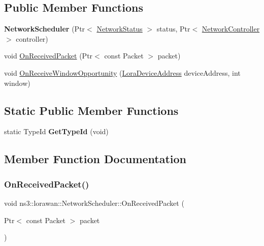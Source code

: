 \subsection*{Public Member Functions}
\begin{DoxyCompactItemize}
\item 
\mbox{\label{classns3_1_1lorawan_1_1NetworkScheduler_a02db446a0b34906f22f1f1769a15ae09}} 
{\bfseries Network\+Scheduler} (Ptr$<$ \hyperlink{classns3_1_1lorawan_1_1NetworkStatus}{Network\+Status} $>$ status, Ptr$<$ \hyperlink{classns3_1_1lorawan_1_1NetworkController}{Network\+Controller} $>$ controller)
\item 
void \hyperlink{classns3_1_1lorawan_1_1NetworkScheduler_a221f76541ed8a879c784beb2235abc42}{On\+Received\+Packet} (Ptr$<$ const Packet $>$ packet)
\item 
void \hyperlink{classns3_1_1lorawan_1_1NetworkScheduler_a9394830ed7fc351aa846a4c0635ddadc}{On\+Receive\+Window\+Opportunity} (\hyperlink{classns3_1_1lorawan_1_1LoraDeviceAddress}{Lora\+Device\+Address} device\+Address, int window)
\end{DoxyCompactItemize}
\subsection*{Static Public Member Functions}
\begin{DoxyCompactItemize}
\item 
\mbox{\label{classns3_1_1lorawan_1_1NetworkScheduler_ad04cad4151b5efbce6b6f54fb0e16af6}} 
static Type\+Id {\bfseries Get\+Type\+Id} (void)
\end{DoxyCompactItemize}


\subsection{Member Function Documentation}
\mbox{\label{classns3_1_1lorawan_1_1NetworkScheduler_a221f76541ed8a879c784beb2235abc42}} 
\subsubsection{\texorpdfstring{On\+Received\+Packet()}{OnReceivedPacket()}}
{\footnotesize\ttfamily void ns3\+::lorawan\+::\+Network\+Scheduler\+::\+On\+Received\+Packet (\begin{DoxyParamCaption}\item[{Ptr$<$ const Packet $>$}]{packet }\end{DoxyParamCaption})}

